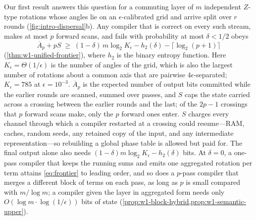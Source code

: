 \documentclass[aps,prx,reprint,superscriptaddress,floatfix,longbibliography]{revtex4-2}
\begin{document}
Our first result answers this question for a commuting layer of $m$
independent $Z$-type rotations whose angles lie on an
$\epsilon$-calibrated grid and arrive split over $r$ rounds
(\cref{fig:intro-dispersal}b).  Any compiler that is correct on every such
stream, makes at most $p$ forward scans, and fails with probability at
most $\delta<1/2$ obeys
\begin{equation}\label{eq:frontier}
 \overline A_p+pS\;\geq\;(1-\delta)\,m\log_2K_\epsilon-h_2(\delta)
 -\lceil\log_2(p+1)\rceil
\end{equation}
(\cref{thm:w1-unified-frontier}), where $h_2$ is the binary entropy
function.  Here $K_\epsilon=\Theta(1/\epsilon)$ is
the number of angles of the grid, which is also the largest number of
rotations about a common axis that are pairwise $4\epsilon$-separated;
$K_\epsilon=785$ at $\epsilon=10^{-3}$.  $\overline A_p$ is the expected
number of output bits committed while the earlier rounds are scanned,
summed over passes, and $S$ caps the state carried across a crossing
between the earlier rounds and the last; of the $2p-1$ crossings that $p$
forward scans make, only the $p$ forward ones enter.  $S$ charges every
channel through which a compiler restarted at a crossing could
resume---RAM, caches, random seeds, any retained copy of the input, and
any intermediate representation---so rebuilding a global phase table is
allowed but paid for.  The final output alone also needs
$(1-\delta)m\log_2K_\epsilon-h_2(\delta)$ bits.  At $\delta=0$, a one-pass
compiler that keeps the running sums and emits one aggregated rotation per
term attains \cref{eq:frontier} to leading order, and so does a $p$-pass
compiler that merges a different block of terms on each pass, as long as
$p$ is small compared with $m/\log m$; a compiler given the layer in
aggregated form needs only $O(\log m\cdot\log(1/\epsilon))$ bits of state
(\cref{prop:w1-block-hybrid,prop:w1-semantic-upper}).
\end{document}

